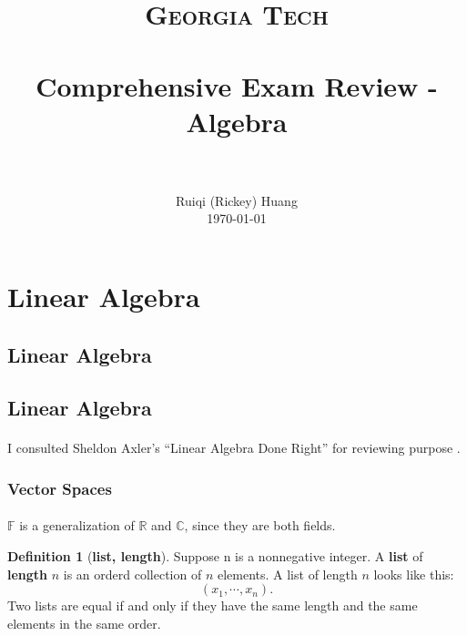 \documentclass[paper=a4, fontsize=11pt]{scrartcl}
\title{
		\usefont{OT1}{bch}{b}{n}
		\normalfont \normalsize \textsc{Georgia Tech} \\ [25pt]
		\horrule{0.5pt} \\[0.4cm]
		\huge Comprehensive Exam Review - Algebra \\
		\horrule{2pt} \\[0.5cm]
}
\author{
		\normalfont 								\normalsize
        Ruiqi (Rickey) Huang                 \\\normalsize
        \today
}
\date{}
\numberwithin{equation}{section}		%
\numberwithin{figure}{section}			%
\numberwithin{table}{section}				%
\newcommand{\RNum}[1]{\uppercase\expandafter{\romannumeral #1\relax}}
\theoremstyle{definition}
\newtheorem{definition}{Definition}[section]
\theoremstyle{remark}
\theoremstyle{example}
\begin{document}
\maketitle
\thispagestyle{empty}

\newpage

\tableofcontents
\thispagestyle{empty}

\newpage

\section{Linear Algebra}

\subsection{Linear Algebra \RNum{1}}

\subsection{Linear Algebra \RNum{2}}

\paragraph{}

I consulted Sheldon Axler's ``Linear Algebra Done Right'' for reviewing purpose \cite{axler_linear_2015}.

\subsubsection{Vector Spaces}

\paragraph{}

$\mathbb{F}$ is a generalization of $\mathbb{R}$ and $\mathbb{C}$, since they are both fields.

\begin{definition}[\textbf{list, length}]
    Suppose n is a nonnegative integer. A \textbf{list} of \textbf{length} $n$ is an orderd collection of $n$ elements. A list of length $n$ looks like this:
    \begin{equation}
        (x_1, \cdots, x_n).
    \end{equation}
    Two lists are equal if and only if they have the same length and the same elements in the same order.
\end{definition}
\end{document}
